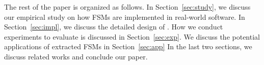 The rest of the paper is organized as follows. 
In Section~\ref{sec:study}, 
we discuss our empirical study on how FSMs are implemented in real-world software.
In Section~\ref{sec:impl}, we discuss the detailed design of \Tool{}.
How we conduct experiments to evaluate \Tool{} is discussed in Section~\ref{sec:exp}. 
We discuss the potential applications of extracted FSMs in Section~\ref{sec:app}
In the last two sections, we discuss related works and conclude our paper. 



